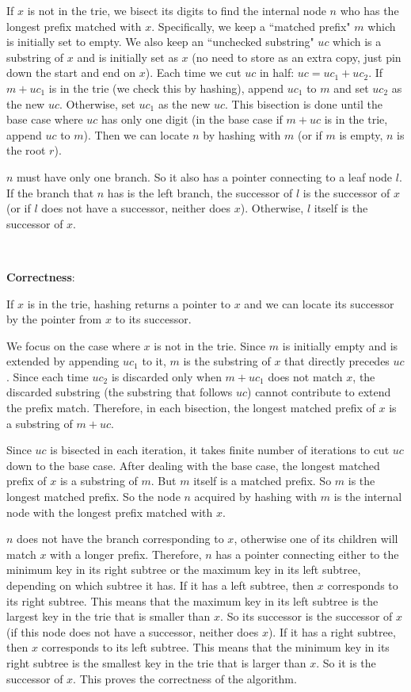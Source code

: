 \documentclass{article}
\begin{document}
If $x$ is not in the trie, we bisect its digits to find the internal node $n$ who has the longest prefix matched with $x$. Specifically, we keep a ``matched prefix" $m$ which is initially set to empty. We also keep an ``unchecked substring" $uc$ which is a substring of $x$ and is initially set as $x$ (no need to store as an extra copy, just pin down the start and end on $x$). Each time we cut $uc$ in half: $uc=uc_1+uc_2$. If $m+uc_1$ is in the trie (we check this by hashing), append $uc_1$ to $m$ and set $uc_2$ as the new $uc$. Otherwise, set $uc_1$ as the new $uc$. This bisection is done until the base case where $uc$ has only one digit (in the base case if $m+uc$ is in the trie, append $uc$ to $m$). Then we can locate $n$ by hashing with $m$ (or if $m$ is empty, $n$ is the root $r$).

$n$ must have only one branch. So it also has a pointer connecting to a leaf node $l$. If the branch that $n$ has is the left branch, the successor of $l$ is the successor of $x$ (or if $l$ does not have a successor, neither does $x$). Otherwise, $l$ itself is the successor of $x$.

~

\noindent\textbf{Correctness}:

If $x$ is in the trie, hashing returns a pointer to $x$ and we can locate its successor by the pointer from $x$ to its successor.

We focus on the case where $x$ is not in the trie. Since $m$ is initially empty and is extended by appending $uc_1$ to it, $m$ is the substring of $x$ that directly precedes $uc$. Since each time $uc_2$ is discarded only when $m+uc_1$ does not match $x$, the discarded substring (the substring that follows $uc$) cannot contribute to extend the prefix match. Therefore, in each bisection, the longest matched prefix of $x$ is a substring of $m+uc$.

Since $uc$ is bisected in each iteration, it takes finite number of iterations to cut $uc$ down to the base case. After dealing with the base case, the longest matched prefix of $x$ is a substring of $m$. But $m$ itself is a matched prefix. So $m$ is the longest matched prefix. So the node $n$ acquired by hashing with $m$ is the internal node with the longest prefix matched with $x$.

$n$ does not have the branch corresponding to $x$, otherwise one of its children will match $x$ with a longer prefix. Therefore, $n$ has a pointer connecting either to the minimum key in its right subtree or the maximum key in its left subtree, depending on which subtree it has. If it has a left subtree, then $x$ corresponds to its right subtree. This means that the maximum key in its left subtree is the largest key in the trie that is smaller than $x$. So its successor is the successor of $x$ (if this node does not have a successor, neither does $x$). If it has a right subtree, then $x$ corresponds to its left subtree. This means that the minimum key in its right subtree is the smallest key in the trie that is larger than $x$. So it is the successor of $x$. This proves the correctness of the algorithm.
\end{document}
